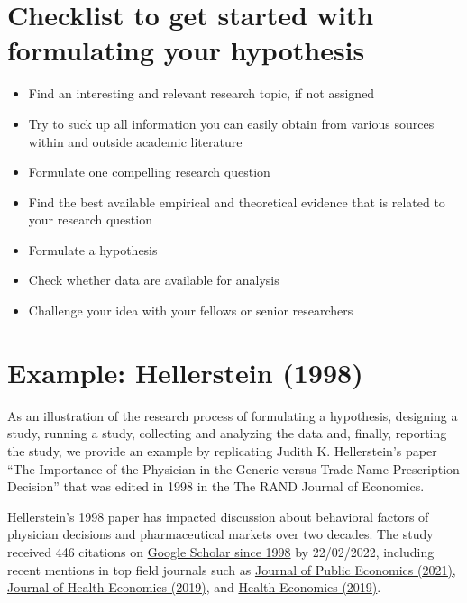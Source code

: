 \documentclass[
]{book}
\providecommand{\tightlist}{%
  \setlength{\itemsep}{0pt}\setlength{\parskip}{0pt}}
\begin{document}
\hypertarget{checklist-to-get-started-with-formulating-your-hypothesis}{%
\section{Checklist to get started with formulating your
hypothesis}\label{checklist-to-get-started-with-formulating-your-hypothesis}}

\begin{itemize}
\tightlist
\item
  Find an interesting and relevant research topic, if not assigned
\item
  Try to suck up all information you can easily obtain from various
  sources within and outside academic literature
\item
  Formulate one compelling research question
\item
  Find the best available empirical and theoretical evidence that is
  related to your research question
\item
  Formulate a hypothesis
\item
  Check whether data are available for analysis
\item
  Challenge your idea with your fellows or senior researchers
\end{itemize}

\hypertarget{example-hellerstein-1998}{%
\section{Example: Hellerstein (1998)}\label{example-hellerstein-1998}}

As an illustration of the research process of formulating a hypothesis,
designing a study, running a study, collecting and analyzing the data
and, finally, reporting the study, we provide an example by replicating
Judith K. Hellerstein's paper ``The Importance of the Physician in the
Generic versus Trade-Name Prescription Decision'' that was edited in
1998 in the The RAND Journal of Economics.

Hellerstein's 1998 paper has impacted discussion about behavioral
factors of physician decisions and pharmaceutical markets over two
decades. The study received 446 citations on
\href{https://scholar.google.de/scholar?cites=9301208853808127317\&as_sdt=2005\&sciodt=0,5\&hl=de}{Google
Scholar since 1998} by 22/02/2022, including recent mentions in top
field journals such as
\href{https://www.sciencedirect.com/science/article/abs/pii/S0047272718301968}{Journal
of Public Economics (2021)},
\href{https://www.sciencedirect.com/science/article/pii/S0167629617307348}{Journal
of Health Economics (2019)}, and
\href{https://onlinelibrary.wiley.com/doi/full/10.1002/hec.3774}{Health
Economics (2019)}.
\end{document}
